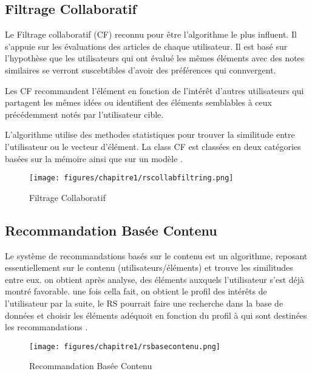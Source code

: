 	\subsection{Filtrage Collaboratif}
	\par Le Filtrage collaboratif (CF) reconnu pour être l'algorithme le plus influent. Il s'appuie sur les évaluations des articles de chaque utilisateur. Il est basé sur l'hypothèse que les utilisateurs qui ont évalué les mêmes éléments avec des notes similaires se verront suscebtibles d'avoir des préférences qui connvergent. 
	
	Les CF recommandent l'élément en fonction de l'intérêt d'autres utilisateurs qui partagent les mêmes idées ou identifient des éléments semblables à ceux précédemment notés par l'utilisateur cible.
	
	L'algorithme utilise des methodes statistiques pour trouver la similitude entre l'utilisateur ou le vecteur d'élément. La class CF est classées en deux catégories basées sur la mémoire ainsi que sur un modèle \cite{ch1ref6}. 
	\begin{figure}[H]
    	\begin{center}
    		\texttt{[image: figures/chapitre1/rscollabfiltring.png]}
    	\end{center}
    	\caption {Filtrage Collaboratif \cite{ch1ref16}}
    	\label{fig:fig1ch1}
    \end{figure} 
    
	\subsection{Recommandation Basée Contenu} 
	\par Le système de recommandations basés sur le contenu est un algorithme, reposant essentiellement sur le contenu (utilisateurs/éléments) et trouve les similitudes entre eux. on obtient après analyse, des éléments auxquels l'utilisateur s'est déjà montré favorable. une fois cella fait, on obtient le profil des intérêts de l'utilisateur par la suite, le RS pourrait faire une recherche dans la base de données et choisir les éléments adéquoit en fonction du profil à qui sont destinées les recommandations \cite{ch1ref6,ch1ref7}.
	\begin{figure}[H]
    	\begin{center}
    		\texttt{[image: figures/chapitre1/rsbasecontenu.png]}
    	\end{center}
    	\caption {Recommandation Basée Contenu \cite{ch1ref16}}
    	\label{fig:fig2ch1}
    \end{figure} 
    
